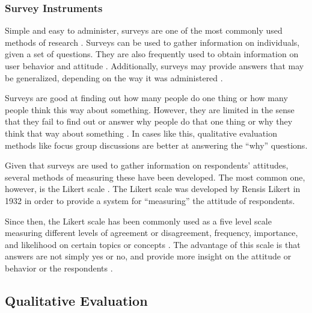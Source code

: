         
        \subsubsection{Survey Instruments}

			Simple and easy to administer, surveys are one of the most commonly used methods of research \citep{goddard1996designing,mathers2007surveys}. Surveys can be used to gather information on individuals, given a set of questions. 
They are also frequently used to obtain information on user behavior and attitude \citep{mathers2007surveys}. Additionally, surveys may provide answers that may be generalized, depending on the way it was administered \citep{newsted1998survey}. 

		Surveys are good at finding out how many people do one thing or how many people think this way about something. However, they are limited in the sense that they fail to find out or answer why people do that one thing or why they think that way about something \citep{mathers2007surveys}. In cases like this, qualitative evaluation methods like focus group discussions are better at answering the ``why'' questions.
        
        Given that surveys are used to gather information on respondents' attitudes, several methods of measuring these have been developed. The most common one, however, is the Likert scale \citep{mcleod2008likert}. The Likert scale was developed by Rensis Likert in 1932 in order to provide a system for ``measuring'' the attitude of respondents. 
        
        Since then, the Likert scale has been commonly used as a five level scale measuring different levels of agreement or disagreement, frequency, importance, and likelihood on certain topics or concepts \citep{mcleod2008likert}. The advantage of this scale is that answers are not simply yes or no, and provide more insight on the attitude or behavior or the respondents \citep{likert1932technique,mcleod2008likert}.

	\subsection{Qualitative Evaluation}
    
